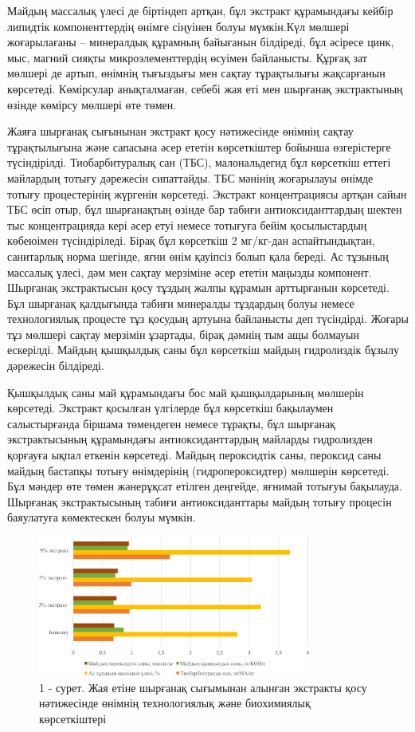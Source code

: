 \begin{multicols}{2}
Майдың массалық үлесі де біртіндеп артқан, бұл экстракт құрамындағы
кейбір липидтік компоненттердің өнімге сіңуінен болуы мүмкін.Күл мөлшері
жоғарылағаны -- минералдық құрамның байығанын білдіреді, бұл әсіресе
цинк, мыс, магний сияқты микроэлементтердің өсуімен байланысты. Құрғақ
зат мөлшері де артып, өнімнің тығыздығы мен сақтау тұрақтылығы
жақсарғанын көрсетеді. Көмірсулар анықталмаған, себебі жая еті мен
шырғанақ экстрактының өзінде көмірсу мөлшері өте төмен.

Жаяға шырғанақ сығынынан экстракт қосу нәтижесінде өнімнің сақтау
тұрақтылығына және сапасына әсер ететін көрсеткіштер бойынша
өзгерістерге түсіндірілді. Тиобарбитуралық сан (ТБС), малональдегид бұл
көрсеткіш еттегі майлардың тотығу дәрежесін сипаттайды. ТБС мәнінің
жоғарылауы өнімде тотығу процестерінің жүргенін көрсетеді. Экстракт
концентрациясы артқан сайын ТБС өсіп отыр, бұл шырғанақтың өзінде бар
табиғи антиоксиданттардың шектен тыс концентрацияда кері әсер етуі
немесе тотығуға бейім қосылыстардың көбеюімен түсіндіріледі. Бірақ бұл
көрсеткіш 2 мг/кг-дан аспайтындықтан, санитарлық норма шегінде,
яғни өнім қауіпсіз болып қала береді. Ас тұзының массалық үлесі, дәм мен
сақтау мерзіміне әсер ететін маңызды компонент. Шырғанақ
экстрактысын қосу тұздың жалпы құрамын арттырғанын көрсетеді. Бұл
шырғанақ қалдығында табиғи минералды тұздардың болуы немесе
технологиялық процесте тұз қосудың артуына байланысты деп түсіндірді.
Жоғары тұз мөлшері сақтау мерзімін ұзартады, бірақ дәмнің тым ащы
болмауын ескерілді. Майдың қышқылдық саны бұл көрсеткіш майдың
гидролиздік бұзылу дәрежесін білдіреді.

Қышқылдық саны май құрамындағы бос май қышқылдарының мөлшерін көрсетеді.
Экстракт қосылған үлгілерде бұл көрсеткіш бақылаумен салыстырғанда
біршама төмендеген немесе тұрақты, бұл шырғанақ экстрактысының
құрамындағы антиоксиданттардың майларды гидролизден қорғауға ықпал
еткенін көрсетеді. Майдың пероксидтік саны, пероксид саны майдың
бастапқы тотығу өнімдерінің (гидропероксидтер) мөлшерін көрсетеді. Бұл
мәндер өте төмен жәнерұқсат етілген деңгейде, яғнимай тотығуы
бақылауда. Шырғанақ экстрактысының табиғи антиоксиданттары
майдың тотығу процесін баяулатуға көмектескен болуы мүмкін.
\end{multicols}

\begin{figure}[H]
	\centering
	\includegraphics[width=0.8\textwidth]{media/pish4/image2}
	\caption*{1 - сурет. Жая етіне шырғанақ сығымынан алынған экстракты қосу
нәтижесінде өнімнің технологиялық және биохимиялық көрсеткіштері}
\end{figure}

